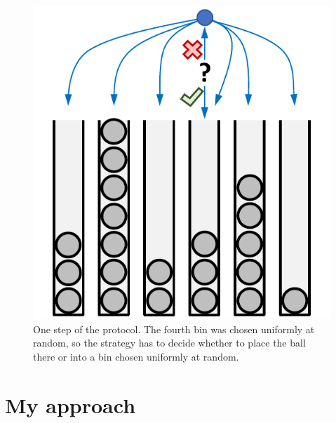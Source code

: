 \begin{figure}
    \centering
    \includegraphics{Chapter1/Figs/two_thinning_intro.pdf}
    \caption{One step of the \TwoThinning protocol. The fourth bin was chosen uniformly at random, so the strategy has to decide whether to place the ball there or into a bin chosen uniformly at random. }
    \label{two-thinning-intro}
\end{figure}



\section{My approach}

